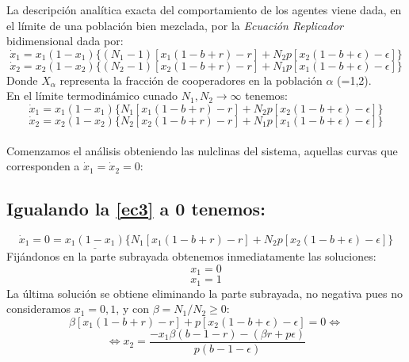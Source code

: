 \documentclass[11pt]{article}
\begin{document}
La descripción analítica exacta del comportamiento de los agentes viene dada, en el límite de una población bien mezclada, por la \textit{Ecuación Replicador} bidimensional dada por:
\begin{equation}\label{ec1}
\dot{x}_1=x_1(1-x_1)\lbrace(N_1-1)[x_1(1-b+r)-r]+N_2p[x_2(1-b+\epsilon)-\epsilon]\rbrace
\end{equation}
\begin{equation}\label{ec2}
\dot{x}_2=x_2(1-x_2)\lbrace(N_2-1)[x_2(1-b+r)-r]+N_1p[x_1(1-b+\epsilon)-\epsilon]\rbrace
\end{equation}
Donde $X_\alpha$ representa la fracción de cooperadores en la población $\alpha$ (=1,2).\\
En el límite termodinámico cunado $N_1,N_2\rightarrow\infty$ tenemos:
\begin{equation}\label{ec3}
\dot{x}_1=x_1(1-x_1)\lbrace N_1[x_1(1-b+r)-r]+N_2p[x_2(1-b+\epsilon)-\epsilon]\rbrace
\end{equation}
\begin{equation}\label{ec4}
\dot{x}_2=x_2(1-x_2)\lbrace N_2[x_2(1-b+r)-r]+N_1p[x_1(1-b+\epsilon)-\epsilon]\rbrace
\end{equation}\\




\noindent Comenzamos el análisis obteniendo las nulclinas del sistema, aquellas curvas que corresponden a $\dot{x}_1=\dot{x}_2=0$:

\subsection*{Igualando la \autoref{ec3} a 0 tenemos:}
\begin{equation*}
\dot{x}_1=0=\underline{x_1(1-x_1)}\lbrace N_1[x_1(1-b+r)-r]+N_2p[x_2(1-b+\epsilon)-\epsilon]\rbrace
\end{equation*}
Fijándonos en la parte subrayada obtenemos inmediatamente las soluciones:
\begin{equation}\label{ec5}
x_1=0
\end{equation}
\begin{equation}\label{ec6}
x_1=1
\end{equation}
La última solución se obtiene eliminando la parte subrayada, no  negativa pues no consideramos $x_1=0,1$, y con $\beta=N_1/N_2\geq0$:
\begin{equation*}
\beta[x_1(1-b+r)-r]+p[x_2(1-b+\epsilon)-\epsilon]=0\Longleftrightarrow
\end{equation*}
\begin{equation}\label{ec7}
\Longleftrightarrow x_2=\dfrac{-x_1\beta(b-1-r)-(\beta r+p\epsilon)}{p(b-1-\epsilon)}
\end{equation}
\end{document}
